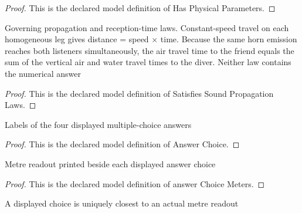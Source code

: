 \begin{proof}
  This is the declared model definition of Has Physical Parameters.
\end{proof}
\begin{definition}
  \label{def:physics:phyx-mini-0168:phyxminiproblems-problemphyxmini0168-satisfiessoundpropagationlaws}
  Governing propagation and reception-time laws. Constant-speed travel on each homogeneous leg gives distance = speed × time. Because the same horn emission reaches both listeners simultaneously, the air travel time to the friend equals the sum of the vertical air and water travel times to the diver. Neither law contains the numerical answer
\end{definition}
\begin{proof}
  This is the declared model definition of Satisfies Sound Propagation Laws.
\end{proof}
\begin{definition}
  \label{def:physics:phyx-mini-0168:phyxminiproblems-problemphyxmini0168-answerchoice}
  Labels of the four displayed multiple-choice answers
\end{definition}
\begin{proof}
  This is the declared model definition of Answer Choice.
\end{proof}
\begin{definition}
  \label{def:physics:phyx-mini-0168:phyxminiproblems-problemphyxmini0168-answerchoicemeters}
  Metre readout printed beside each displayed answer choice
\end{definition}
\begin{proof}
  This is the declared model definition of answer Choice Meters.
\end{proof}
\begin{definition}
  \label{def:physics:phyx-mini-0168:phyxminiproblems-problemphyxmini0168-isclosestanswerchoice}
  A displayed choice is uniquely closest to an actual metre readout
\end{definition}
